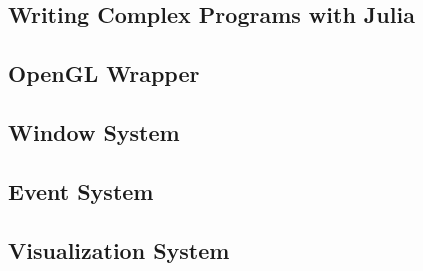 \subsection{Writing Complex Programs with Julia}
\subsection{OpenGL Wrapper}
\subsection{Window System}
\subsection{Event System}
\subsection{Visualization System}
